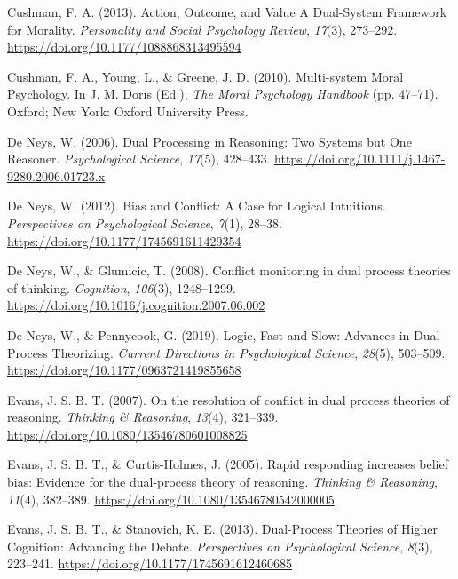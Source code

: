 \documentclass[
  american,
  man,floatsintext]{apa7}
\begin{document}
\leavevmode\hypertarget{ref-cushman_action_2013}{}%
Cushman, F. A. (2013). Action, Outcome, and Value A Dual-System Framework for Morality. \emph{Personality and Social Psychology Review}, \emph{17}(3), 273--292. \url{https://doi.org/10.1177/1088868313495594}

\leavevmode\hypertarget{ref-cushman_multisystem_2010}{}%
Cushman, F. A., Young, L., \& Greene, J. D. (2010). Multi-system Moral Psychology. In J. M. Doris (Ed.), \emph{The Moral Psychology Handbook} (pp. 47--71). Oxford; New York: Oxford University Press.

\leavevmode\hypertarget{ref-deneys_dual_2006}{}%
De Neys, W. (2006). Dual Processing in Reasoning: Two Systems but One Reasoner. \emph{Psychological Science}, \emph{17}(5), 428--433. \url{https://doi.org/10.1111/j.1467-9280.2006.01723.x}

\leavevmode\hypertarget{ref-deneys_bias_2012}{}%
De Neys, W. (2012). Bias and Conflict: A Case for Logical Intuitions. \emph{Perspectives on Psychological Science}, \emph{7}(1), 28--38. \url{https://doi.org/10.1177/1745691611429354}

\leavevmode\hypertarget{ref-deneys_conflict_2008}{}%
De Neys, W., \& Glumicic, T. (2008). Conflict monitoring in dual process theories of thinking. \emph{Cognition}, \emph{106}(3), 1248--1299. \url{https://doi.org/10.1016/j.cognition.2007.06.002}

\leavevmode\hypertarget{ref-deneys_logic_2019}{}%
De Neys, W., \& Pennycook, G. (2019). Logic, Fast and Slow: Advances in Dual-Process Theorizing. \emph{Current Directions in Psychological Science}, \emph{28}(5), 503--509. \url{https://doi.org/10.1177/0963721419855658}

\leavevmode\hypertarget{ref-evans_resolution_2007}{}%
Evans, J. S. B. T. (2007). On the resolution of conflict in dual process theories of reasoning. \emph{Thinking \& Reasoning}, \emph{13}(4), 321--339. \url{https://doi.org/10.1080/13546780601008825}

\leavevmode\hypertarget{ref-evans_rapid_2005}{}%
Evans, J. S. B. T., \& Curtis-Holmes, J. (2005). Rapid responding increases belief bias: Evidence for the dual-process theory of reasoning. \emph{Thinking \& Reasoning}, \emph{11}(4), 382--389. \url{https://doi.org/10.1080/13546780542000005}

\leavevmode\hypertarget{ref-evans_dualprocess_2013}{}%
Evans, J. S. B. T., \& Stanovich, K. E. (2013). Dual-Process Theories of Higher Cognition: Advancing the Debate. \emph{Perspectives on Psychological Science}, \emph{8}(3), 223--241. \url{https://doi.org/10.1177/1745691612460685}
\end{document}
